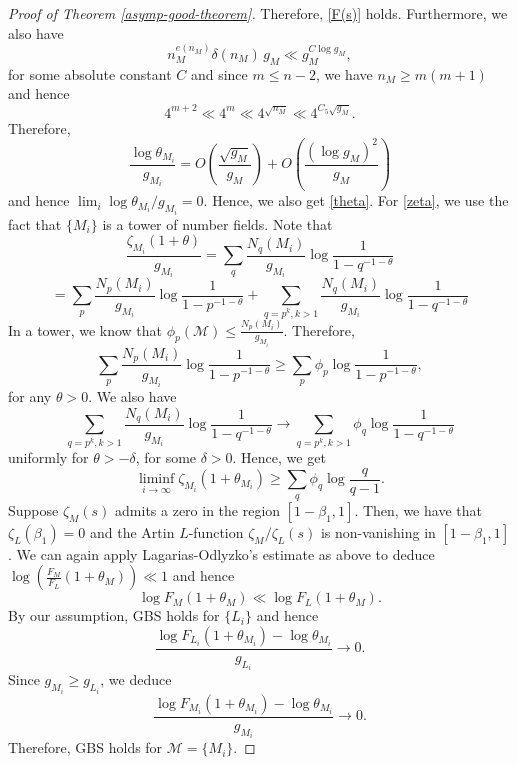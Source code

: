 \documentclass[12pt]{amsart}
\theoremstyle{definition}
\newcommand{\rM}{\mathcal{M}}
\begin{document}
\begin{proof}[Proof of Theorem \ref{asymp-good-theorem}]
Therefore, \eqref{F(s)} holds. Furthermore, we also have
$$
    n_M^{e(n_M)} \delta(n_M) \,g_M \ll g_M^{C \log g_M},
$$
for some absolute constant $C$ and since $m\leq n-2$, we have $n_M \geq m (m+1)$ and hence
$$
     4^{m+2}\ll 4^m \ll 4^{\sqrt{n_M}} \ll 4^{C_5 \sqrt{g_M}}.
$$ 
Therefore, 
\begin{equation*}
\frac{\log \theta_{M_i}}{g_{M_i}} =  O\left(\frac{\sqrt{g_M}}{g_M}\right) + O\left( \frac{(\log g_M)^2}{g_M}\right)
\end{equation*}
and hence $\lim_i \log \theta_{M_i} / g_{M_i} =0$. Hence, we also get \eqref{theta}. For \eqref{zeta}, we use the fact that $\{M_i\}$ is a tower of number fields. Note that
\begin{equation*}
\frac{\zeta_{M_i}(1+\theta)}{g_{M_i}} = \sum_q \frac{N_q(M_i)}{g_{M_i}} \log \frac{1}{1-q^{-1-\theta}}
\end{equation*}
\begin{equation*}
= \sum_p  \frac{N_p(M_i)}{g_{M_i}} \log \frac{1}{1-p^{-1-\theta}} + \sum_{q=p^{k}, k>1} \frac{N_q(M_i)}{g_{M_i}} \log \frac{1}{1-q^{-1-\theta}}
\end{equation*}
In a tower, we know that $\phi_p(\rM) \leq \frac{N_p(M_i)}{g_{M_i}}$. Therefore,
\begin{equation*}
\sum_p  \frac{N_p(M_i)}{g_{M_i}} \log \frac{1}{1-p^{-1-\theta}} \geq \sum_p \phi_p  \log \frac{1}{1-p^{-1-\theta}},
\end{equation*}
for any $\theta>0$. We also have
\begin{equation*}
\sum_{q=p^{k}, k>1} \frac{N_q(M_i)}{g_{M_i}} \log \frac{1}{1-q^{-1-\theta}} \to \sum_{q=p^{k}, k>1} \phi_q \log \frac{1}{1-q^{-1-\theta}} 
\end{equation*}
uniformly for $\theta > -\delta$, for some $\delta>0$. Hence, we get
\begin{equation*}
\liminf_{i\to \infty} \zeta_{M_i}(1+\theta_{M_i}) \geq \sum_q \phi_q \log \frac{q}{q-1}.
\end{equation*}
Suppose $\zeta_M(s)$ admits a zero in the region $[1-\beta_1, 1]$. Then, we have that $\zeta_L(\beta_1)=0$ and the Artin $L$-function $\zeta_M/\zeta_L(s)$ is non-vanishing in $[1-\beta_1, 1]$. We can again apply Lagarias-Odlyzko's estimate as above to deduce $\log \left(\frac{F_M}{F_L}(1+\theta_M)\right) \ll 1$  and hence
\begin{equation*}
    \log F_M(1+\theta_M) \ll \log F_L(1+\theta_M).
\end{equation*}
By our assumption, GBS holds for $\{L_i\}$ and hence 
\begin{equation*}
    \frac{\log F_{L_i}(1+\theta_{M_i}) - \log \theta_{M_i}}{g_{L_i}} \to 0.
\end{equation*}
Since $g_{M_i}\geq g_{L_i}$, we deduce 
\begin{equation*}
    \frac{\log F_{M_i}(1+\theta_{M_i}) - \log \theta_{M_i}}{g_{M_i}} \to 0.
\end{equation*}
Therefore, GBS holds for $\rM=\{M_i\}$.
\end{proof}
\end{document}
